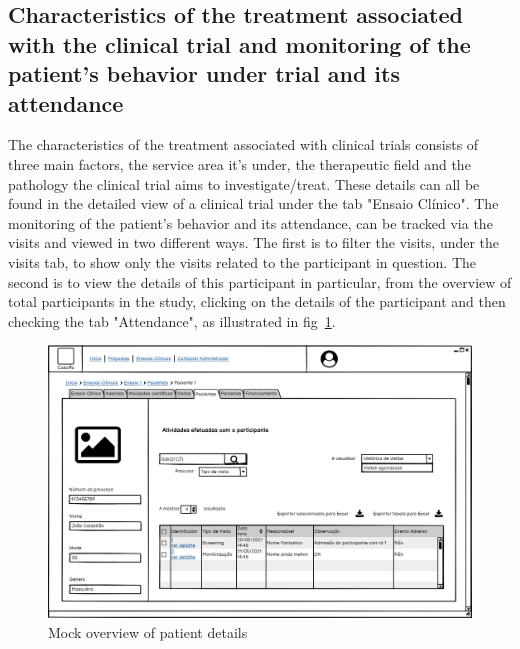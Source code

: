 \subsection{Characteristics of the treatment associated with the clinical trial and monitoring of the patient’s behavior under trial and its attendance}
The characteristics of the treatment associated with clinical trials consists of three main factors, the service area it's under, the therapeutic field and the pathology the clinical trial aims to investigate/treat. These details can all be found in the detailed view of a clinical trial under the tab "Ensaio Clínico".  
The monitoring of the patient's behavior and its attendance, can be tracked via the visits and viewed in two different ways. The first is to filter the visits, under the visits tab, to show only the visits related to the participant in question. The second is to view the details of this participant in particular, from the overview of total participants in the study, clicking on the details of the participant and then checking the tab "Attendance", as illustrated in fig~\ref{fig:ensaio-paciente-detalhes}. 

\begin{figure}[H]
    \centering
    \includegraphics[scale=0.35]{images/ensaio-paciente-detalhes.png}
    \caption{Mock overview of patient details}
    \label{fig:ensaio-paciente-detalhes}
\end{figure}


